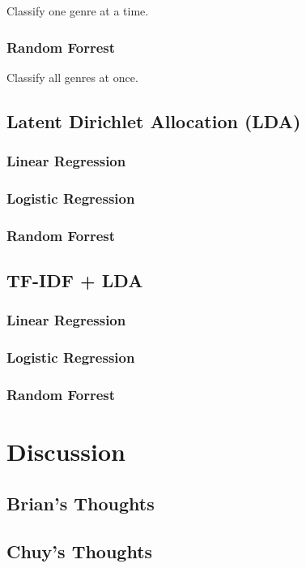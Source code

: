 \documentclass[11pt]{article}
\begin{document}
Classify one genre at a time.

\subsubsection{Random Forrest}

Classify all genres at once.


\subsection{Latent Dirichlet Allocation (LDA)}
\label{sec:lda}

\subsubsection{Linear Regression}

\subsubsection{Logistic Regression}

\subsubsection{Random Forrest}

\subsection{TF-IDF + LDA}
\label{sec:tfidf_lda}

\subsubsection{Linear Regression}

\subsubsection{Logistic Regression}

\subsubsection{Random Forrest}

\section{Discussion}
\label{sec:discussion}

\subsection{Brian's Thoughts}

\subsection{Chuy's Thoughts}

{}

\end{document}
